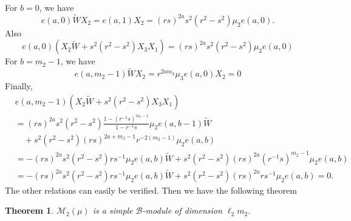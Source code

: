 \documentclass[12 pt,reqno]{amsart}
\numberwithin{equation}{section}
\newtheorem{thm}{Theorem}[section]
\theoremstyle{definition}
\theoremstyle{definition}
\theoremstyle{remark}
\theoremstyle{remark}
\begin{document}
For $b=0$, we have 
\[e(a,0)\tilde{W}X_2=e(a,1)X_2=(rs)^{2a}s^2(r^2-s^2)\mu_2e(a,0).\]
Also 
\[e(a,0)\left(X_2\tilde{W}+s^2(r^2-s^2)X_3X_1\right)=(rs)^{2a}s^2(r^2-s^2)\mu_2e(a,0)\]
For $b=m_2-1$, we have \[e(a,m_2-1)\tilde{W}X_2=r^{2am_2}\mu_3e(a,0)X_2=0\]
Finally,
\begin{align*}
    &e(a,m_2-1)\left(X_2\tilde{W}+s^2(r^2-s^2)X_3X_1\right)\\
    &=(rs)^{2a}s^2 (r^2 - s^2)  
           \displaystyle \frac{1 - (r^{-1}s)^{m_2-1}}{1 - r^{-1}s} \mu_2 e(a,b-1)\tilde{W} \\
          &\quad+s^2(r^2-s^2)(rs)^{2a+m_2-1}r^{-2(m_2-1)}\mu_2 e(a,b)\\
     &=-(rs)^{2a}s^2 (r^2 - s^2) rs^{-1} \mu_2 e(a,b)\tilde{W}+s^2(r^2-s^2)(rs)^{2a}(r^{-1}s)^{m_2-1}\mu_2 e(a,b)\\
     &=-(rs)^{2a}s^2 (r^2 - s^2) rs^{-1} \mu_2 e(a,b)\tilde{W}+s^2(r^2-s^2)(rs)^{2a}rs^{-1}\mu_2 e(a,b)=0. 
\end{align*}
The other relations can easily be verified. Then we have the following theorem
\begin{thm}\label{dim2}
    $\mathcal{M}_2(\mu)$ is a simple $\mathcal{B}$-module of dimension $\ell_2 m_2$.
\end{thm}
\end{document}

